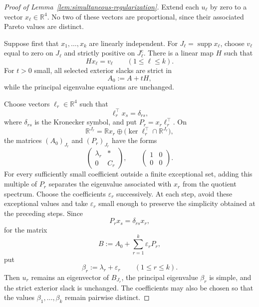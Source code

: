 \documentclass[11pt,a4paper]{article}
\theoremstyle{definition}
\newcommand{\R}{\mathbb R}
\newcommand{\supp}{\operatorname{supp}}
\begin{document}
\begin{proof}[Proof of Lemma~\ref{lem:simultaneous-regularization}]
Extend each $u_\ell$ by zero to a vector $x_\ell\in\R^4$. No two of
these vectors are proportional, since their associated Pareto values
are distinct.

Suppose first that $x_1,\ldots,x_k$ are linearly independent. For
$J_\ell=\supp x_\ell$, choose $v_\ell$ equal to zero on $J_\ell$ and
strictly positive on $J_\ell^{\mathrm c}$. There is a linear map $H$
such that
$$
Hx_\ell=v_\ell
\qquad
(1\leq\ell\leq k).
$$
For $t>0$ small, all selected exterior slacks are strict in
$$
A_0:=A+tH,
$$
while the principal eigenvalue equations are unchanged.

Choose vectors $\ell_r\in\R^4$ such that
$$
\ell_r^\top x_s=\delta_{rs},
$$
where $\delta_{rs}$ is the Kronecker symbol, and put
$P_r=x_r\ell_r^\top$. On
$$
\R^{J_r}
=
\R x_r\oplus\bigl(\ker\ell_r^\top\cap\R^{J_r}\bigr),
$$
the matrices $(A_0)_{J_r}$ and $(P_r)_{J_r}$ have the forms
$$
\begin{pmatrix}
\lambda_r&*\\
0&C_r
\end{pmatrix},
\qquad
\begin{pmatrix}
1&0\\
0&0
\end{pmatrix}.
$$
For every sufficiently small coefficient outside a finite exceptional
set, adding this multiple of $P_r$ separates the eigenvalue associated
with $x_r$ from the quotient spectrum. Choose the coefficients
$\varepsilon_r$ successively. At each step, avoid these exceptional
values and take $\varepsilon_r$ small enough to preserve the simplicity
obtained at the preceding steps. Since
$$
P_rx_s=\delta_{rs}x_r,
$$
for the matrix
$$
B:=A_0+\sum_{r=1}^k\varepsilon_rP_r,
$$
put
$$
\beta_r:=\lambda_r+\varepsilon_r
\qquad
(1\leq r\leq k).
$$
Then $u_r$ remains an eigenvector of $B_{J_r}$, the principal
eigenvalue $\beta_r$ is simple, and the strict exterior slack is
unchanged. The coefficients may also be chosen so that the values
$\beta_1,\ldots,\beta_k$ remain pairwise distinct.


\end{proof}
\end{document}
